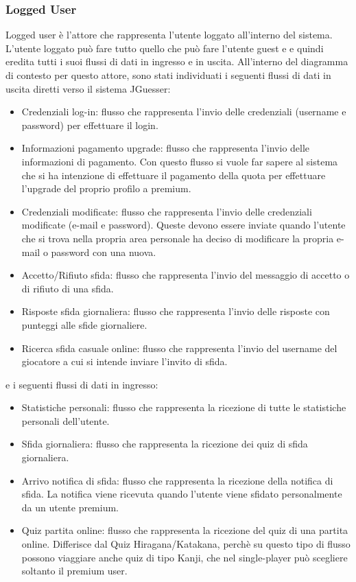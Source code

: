 \subsubsection{Logged User}
Logged user è l'attore che rappresenta l'utente loggato all'interno del sistema. L'utente loggato può fare tutto quello che può fare l'utente guest e e quindi eredita tutti i suoi flussi di dati in ingresso e in uscita. All'interno del diagramma di contesto per questo attore, sono stati individuati i seguenti flussi di dati in uscita diretti verso il sistema JGuesser:
\begin{itemize}
    \item Credenziali log-in: flusso che rappresenta l'invio delle credenziali (username e password) per effettuare il login.
    \item Informazioni pagamento upgrade: flusso che rappresenta l'invio delle informazioni di pagamento. Con questo flusso si vuole far sapere al sistema che si ha intenzione di effettuare il pagamento della quota per effettuare l'upgrade del proprio profilo a premium.
    \item Credenziali modificate: flusso che rappresenta l'invio delle credenziali modificate (e-mail e password). Queste devono essere inviate quando l'utente che si trova nella propria area personale ha deciso di modificare la propria e-mail o password con una nuova.
    \item Accetto/Rifiuto sfida: flusso che rappresenta l'invio del messaggio di accetto o di rifiuto di una sfida.
    \item Risposte sfida giornaliera: flusso che rappresenta l'invio delle risposte con punteggi alle sfide giornaliere.
    \item Ricerca sfida casuale online: flusso che rappresenta l'invio del username del giocatore a cui si intende inviare l'invito di sfida.
\end{itemize}
\noindent
e i seguenti flussi di dati in ingresso:
\begin{itemize}
    \item Statistiche personali: flusso che rappresenta la ricezione di tutte le statistiche personali dell'utente.
    \item Sfida giornaliera: flusso che rappresenta la ricezione dei quiz di sfida giornaliera.
    \item Arrivo notifica di sfida: flusso che rappresenta la ricezione della notifica di sfida. La notifica viene ricevuta quando l'utente viene sfidato personalmente da un utente premium.
    \item Quiz partita online: flusso che rappresenta la ricezione del quiz di una partita online. Differisce dal Quiz Hiragana/Katakana, perchè su questo tipo di flusso possono viaggiare anche quiz di tipo Kanji, che nel single-player può scegliere soltanto il premium user. 
\end{itemize}

